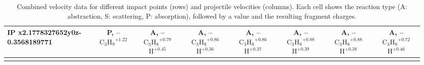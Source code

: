 \begin{table}[t]
\begin{tabular}{lccccccc}
\midrule
\textbf{IP x2.1778327652y0z-0.3568189771} & \makecell{P, -- \\ $\mathrm{C_3H_9}^{+1.22}$} & \makecell{A, -- \\ $\mathrm{C_3H_8}^{+0.79}$ \\ $\mathrm{H}^{+0.45}$} & \makecell{A, -- \\ $\mathrm{C_3H_8}^{+0.86}$ \\ $\mathrm{H}^{+0.36}$} & \makecell{A, -- \\ $\mathrm{C_3H_8}^{+0.86}$ \\ $\mathrm{H}^{+0.37}$} & \makecell{A, -- \\ $\mathrm{C_3H_8}^{+0.88}$ \\ $\mathrm{H}^{+0.39}$} & \makecell{A, -- \\ $\mathrm{C_3H_8}^{+0.88}$ \\ $\mathrm{H}^{+0.38}$} & \makecell{A, -- \\ $\mathrm{C_3H_8}^{+0.72}$ \\ $\mathrm{H}^{+0.46}$} \\
\midrule
\arrayrulecolor{black}
\bottomrule
\end{tabular}
\caption{Combined velocity data for different impact points (rows) and projectile velocities (columns). Each cell shows the reaction type (A: abstraction, S: scattering, P: absorption), followed by a value and the resulting fragment charges.}
\label{tab:combined_velocity_data}
\end{table}
